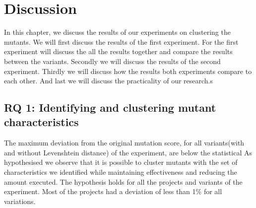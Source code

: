 \documentclass[../main]{subfiles}
\begin{document}
\chapter{Discussion}
\label{ch:discussion}
In this chapter, we discuss the results of our experiments on clustering the mutants.
We will first discuss the results of the first experiment. 
For the first experiment will discuss the all the results together and compare the results between the variants.
Secondly we will discuss the results of the second experiment.
Thirdly we will discuss how the results both experiments compare to each other.
And last we will discuss the practicality of our research.s

\section{RQ 1: Identifying and clustering mutant characteristics}
The maximum deviation from the original mutation score, for all variants(with and without Levenshtein distance) of the experiment, are below the statistical 
As hypothesised we observe that it is possible to cluster mutants with the set of characteristics we identified while maintaining effectiveness and reducing the amount executed.
The hypothesis holds for all the projects and variants of the experiment.
Most of the projects had a deviation of less than 1\% for all variations.
\end{document}

